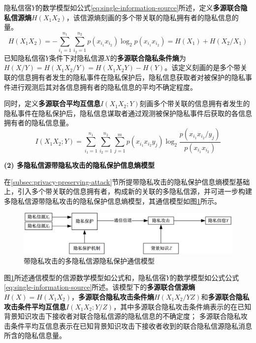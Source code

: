 隐私信宿$Y$的数学模型如公式\ref{eq:single-information-source}所述，定义\textbf{多源联合隐私信源熵}$H(X_{1}X_{2})$，该信源熵刻画的多个带关联的隐私拥有者的隐私信息的量。
\begin{equation}
H(X_{1}X_{2}) = -\sum_{i_{1}=1}^{n_{1}}\sum_{i_{2}=1}^{n_{2}}p(x_{i_{1}}x_{i_{2}})\log_{2}p(x_{i_{1}}x_{i_{2}})=H(X_{1})+H(X_{2}/X_{1})
\end{equation}
已知隐私信宿$Y$条件下对隐私信源$X$的\textbf{多源联合隐私条件熵}为$H(X/Y)=H(X_{1}X_{2}/Y)=H(X_{1}X_{2}Y)-H(Y)$。该定义刻画的是多个带关联的信息拥有者发生的隐私事件在隐私保护后，隐私信息获取者对被保护的隐私事件进行观测后其对各信息拥有者的隐私信息的平均不确定程度。

同时，定义\textbf{多源联合平均互信息}$I(X_{1}X_{2};Y)$刻画多个带关联的信息拥有者发生的隐私事件在隐私保护后，隐私信息谋取者通过观测被保护隐私事件后获取的各信息拥有者的隐私信息量。
\begin{equation}
I(X_{1}X_{2};Y)=\sum_{i_{1}=1}^{n_{1}}\sum_{i_{2}=1}^{n_{2}}\sum_{j=1}^{m}p(x_{i_{1}}x_{i_{2}}y_{j})\log_{2}\frac{p(x_{i_{1}}x_{i_{2}}/y_{j})}{p(x_{i_{1}}x_{i_{2}})}
\end{equation}

\textbf{(2) 多隐私信源带隐私攻击的隐私保护信息熵模型}

在\ref{subsec:privacy-preserving-attack}节所提带隐私攻击的隐私保护信息熵模型基础上，引入多个带关联的信息拥有者，构成新的关联的多隐私信源，并可进一步构建多隐私信源带隐私攻击的隐私保护信息熵模型，其通信模型如图\ref{fig:Communication-Model-for-Privacy-of-Multi-Source-attacks}所示。

\begin{figure}[htbp]
	\centering
	\includegraphics[width = 0.95\linewidth]{./figures/Communication-Model-for-Privacy-of-Multi-Source-attacks.png}
	\caption{带隐私攻击的多隐私信源隐私保护通信模型}
	\label{fig:Communication-Model-for-Privacy-of-Multi-Source-attacks}
\end{figure}

图\ref{fig:Communication-Model-for-Privacy-of-Multi-Source-attacks}所述通信模型的信源数学模型如公式和，隐私信宿$Y$的数学模型如公式公式\ref{eq:single-information-source}所述。该模型下的\textbf{多源联合信源熵}$H(X)=H(X_{1}X_{2})$，\textbf{多源联合隐私攻击条件熵}$H(X_{1}X_{2}/YZ)$和\textbf{多源联合隐私攻击条件平均互信息}$I(X_{1}X_{2};Y/Z)$，其中多源联合隐私攻击条件熵表示的在已知背景知识攻击下接收者对联合隐私信源的隐私信息的不确定度； 多源联合隐私攻击条件平均互信息表示在已知背景知识攻击下接收者收到的联合隐私信源隐私消息所含的隐私信息量。

